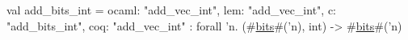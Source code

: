 val add_bits_int = {
  ocaml: "add_vec_int",
  lem: "add_vec_int",
  c: "add_bits_int",
  coq: "add_vec_int"
} : forall 'n. (#\hyperref[zbits]{bits}#('n), int) -> #\hyperref[zbits]{bits}#('n)
